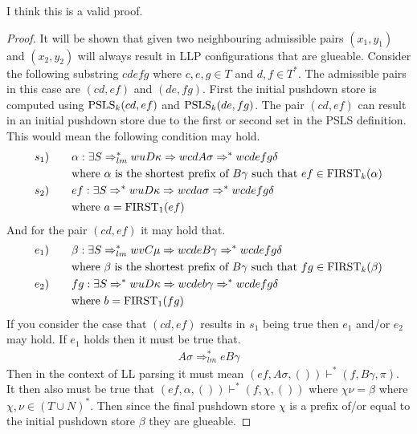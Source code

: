 I think this is a valid proof.
\begin{proof}    
    It will be shown that given two neighbouring admissible pairs $(x_1, y_1)$ and $(x_2, y_2)$ will always result in LLP configurations that are glueable. Consider the following substring $cdefg$ where $c, e, g \in T$ and $d, f \in T^*$. The admissible pairs in this case are $(cd, ef)$ and $(de, fg)$. First the initial pushdown store is computed using $\text{PSLS}_k(cd, ef)$ and $\text{PSLS}_k(de, fg)$. The pair $(cd, ef)$ can result in an initial pushdown store due to the first or second set in the PSLS definition. This would mean the following condition may hold.
    \begin{align*}
        s_1) \qquad & \alpha : \exists S \Rightarrow^*_{lm} wuD\kappa \Rightarrow wcdA\sigma \Rightarrow^* wcdefg\delta \\
        & \text{where } \alpha \text{ is the shortest prefix of } B\gamma \text{ such that } ef \in \text{FIRST}_k(\alpha) \\
        s_2) \qquad & ef : \exists S \Rightarrow^* wuD\kappa \Rightarrow wcda\sigma \Rightarrow^* wcdefg\delta \\
        & \text{where } a = \text{FIRST}_1(ef)
    \end{align*}
    And for the pair $(cd, ef)$ it may hold that.
    \begin{align*}
        e_1) \qquad & \beta : \exists S \Rightarrow^*_{lm} wvC\mu \Rightarrow wcdeB\gamma \Rightarrow^* wcdefg\delta \\
        & \text{where } \beta \text{ is the shortest prefix of } B\gamma \text{ such that } fg \in \text{FIRST}_k(\beta) \\
        e_2) \qquad & fg : \exists S \Rightarrow^* wuD\kappa \Rightarrow wcdeb\gamma \Rightarrow^* wcdefg\delta \\
        & \text{where } b = \text{FIRST}_1(fg)
    \end{align*}
    If you consider the case that $(cd, ef)$ results in $s_1$ being true then $e_1$ and/or $e_2$ may hold. If $e_1$ holds then it must be true that.
    \begin{align*}
        A\sigma \Rightarrow^*_{lm} eB\gamma
    \end{align*}
    Then in the context of LL parsing it must mean $(ef, A\sigma, ()) \vdash^* (f, B\gamma, \pi)$. It then also must be true that $(ef, \alpha, ()) \vdash^* (f, \chi, ())$ where $\chi\nu = \beta$ where $\chi, \nu \in (T \cup N)^*$. Then since the final pushdown store $\chi$ is a prefix of/or equal to the initial pushdown store $\beta$ they are glueable.
    

\end{proof}

